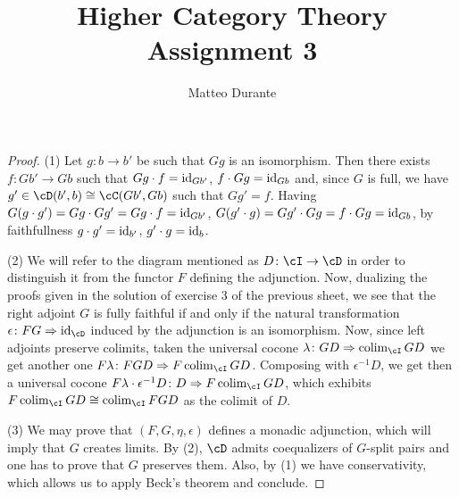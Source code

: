 \documentclass[a4paper,11pt,openany]{scrartcl}
\begin{document}
\title{Higher Category Theory\\ Assignment 3}

\author{Matteo Durante}

\maketitle

\begin{proof}
    (1) Let $g\colon b\rightarrow b'$ be such that $Gg$ is an isomorphism. Then
    there exists $f\colon Gb'\rightarrow Gb$ such that $Gg\cdot f=\operatorname{id}_{Gb'}$,
    $f\cdot Gg=\operatorname{id}_{Gb}$ and, since $G$ is full, we have
    $g'\in\cD(b',b)\cong\cC(Gb',Gb)$ such that $Gg'=f$. Having $G(g\cdot
    g')=Gg\cdot Gg'=Gg\cdot f=\operatorname{id}_{Gb'}$, $G(g'\cdot g)=Gg'\cdot Gg=f\cdot
    Gg=\operatorname{id}_{Gb}$, by faithfullness $g\cdot g'=\operatorname{id}_{b'}$, $g'\cdot g=\operatorname{id}_b$.

    (2) We will refer to the diagram mentioned as $D\colon\cI\rightarrow\cD$ in
    order to distinguish it from the functor $F$ defining the adjunction. Now,
    dualizing the proofs given in the solution of exercise 3 of the previous
    sheet, we see that the right adjoint $G$ is fully faithful if and only if
    the natural transformation $\epsilon\colon FG\Rightarrow\id_{\cD}$ induced
    by the adjunction is an isomorphism. Now, since left adjoints preserve
    colimits, taken the universal cocone $\lambda\colon GD\Rightarrow\colim_\cI
    GD$ we get another one $F\lambda\colon FGD\Rightarrow
    F\colim_{\cI}GD$. Composing with $\epsilon^{-1}D$, we get then a universal
    cocone $F\lambda\cdot\epsilon^{-1}D\colon D\Rightarrow
    F\colim_{\cI}GD$,
    which exhibits $F\colim_{\cI}GD\cong\colim_{\cI}FGD$ as the colimit of $D$.

    (3) We may prove that $(F,G,\eta,\epsilon)$ defines a monadic adjunction,
    which will imply that $G$ creates limits. By (2), $\cD$ admits coequalizers
    of $G$-split pairs and one has to prove that $G$ preserves them.
    Also, by (1) we have conservativity, which allows us to apply Beck's theorem
    and conclude.
\end{proof}
\end{document}

